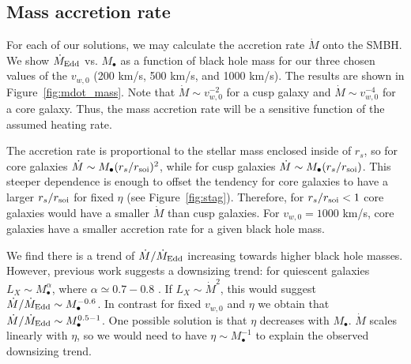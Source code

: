 \documentclass[usenatbib,fleqn]{mn2e}
\newcommand{\eddr}{\dot{M}/\dot{M}_{\rm Edd}}
\newcommand{\Mdote}{\dot{M}_{\rm Edd}}
\newcommand{\rs}{r_s}
\newcommand{\Mbh}[1][]{M_{\bullet#1}}
\newcommand{\soi}{\rm soi}
\newcommand{\rsoi}{r_{\soi}}
\newcommand{\vwO}{v_{w,0}}
\begin{document}
\subsection{Mass accretion rate}
For each of our solutions, we may calculate the accretion rate
$\dot{M}$ onto the SMBH. We show $\Mdote$ vs. $\Mbh$ as a function of
black hole mass for our three chosen values of the $\vwO$ (200 km/s,
500 km/s, and 1000 km/s). The results are shown in
Figure~\ref{fig:mdot_mass}.  Note that $\dot{M}\sim\vwO^{-2}$ for a
cusp galaxy and $\dot{M}\sim\vwO^{-4}$ for a core galaxy. Thus, the
mass accretion rate will be a sensitive function of the assumed
heating rate.

The accretion rate is proportional to the stellar mass enclosed inside
of $\rs$, so for core galaxies $\dot{M}\sim \Mbh (\rs/\rsoi)^{2}$,
while for cusp galaxies $\dot{M}\sim \Mbh (\rs/\rsoi)$.  This steeper
dependence is enough to offset the tendency for core galaxies to have
a larger $\rs/\rsoi$ for fixed $\eta$ (see
Figure~\ref{fig:stag}). Therefore, for $\rs/\rsoi<1$ core galaxies
would have a smaller $\dot{M}$ than cusp galaxies.  For $\vwO=1000$
km/s, core galaxies have a smaller accretion rate for a given black
hole mass.

We find there is a trend of $\eddr$ increasing towards higher black
hole masses. However, previous work suggests a downsizing trend: for
quiescent galaxies $L_X \sim \Mbh^\alpha$, where $\alpha\simeq
0.7-0.8$ \citep{MillerGallo+:2014a}. If $L_X\sim\dot{M}^2$, this would
suggest $\eddr\sim \Mbh^{-0.6}$. In contrast for fixed $\vwO$ and
$\eta$ we obtain that $\eddr\sim \Mbh^{0.5-1}$. One possible solution
is that $\eta$ decreases with $\Mbh$. $\dot{M}$ scales linearly with
$\eta$, so we would need to have $\eta\sim \Mbh^{-1}$ to explain the
observed downsizing trend.
\end{document}

